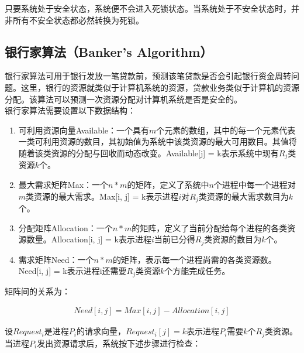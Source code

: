 只要系统处于安全状态，系统便不会进入死锁状态。当系统处于不安全状态时，并非所有不安全状态都必然转换为死锁。

\subsection{银行家算法（Banker's Algorithm）}

银行家算法可用于银行发放一笔贷款前，预测该笔贷款是否会引起银行资金周转问题。这里，银行的资源就类似于计算机系统的资源，贷款业务类似于计算机的资源分配。该算法可以预测一次资源分配对计算机系统是否是安全的。 \\

银行家算法需要设置以下数据结构：

\begin{enumerate}
	\item 可利用资源向量Available：一个具有$ m $个元素的数组，其中的每一个元素代表一类可利用资源的数目，其初始值为系统中该类资源的最大可用数目。其值将随着该类资源的分配与回收而动态改变。Available[j] = k表示系统中现有$ R_j $类资源$ k $个。

	\item 最大需求矩阵Max：一个$ n * m $的矩阵，定义了系统中$ n $个进程中每一个进程对$ m $类资源的最大需求。Max[i, j] = k表示进程$ i $对$ R_j $类资源的最大需求数目为$ k $个。

	\item 分配矩阵Allocation：一个$ n * m $的矩阵，定义了当前分配给每个进程的各类资源数量。Allocation[i, j] = k表示进程$ i $当前已分得$ R_j $类资源的数目为$ k $个。

	\item 需求矩阵Need：一个$ n * m $的矩阵，表示每一个进程尚需的各类资源数。Need[i, j] = k表示进程i还需要$ R_j $类资源$ k $个方能完成任务。
\end{enumerate}

矩阵间的关系为：

\vspace{-1cm}
\begin{align}\nonumber
	Need[i, j] = Max[i, j] - Allocation[i, j]
\end{align}

设$ Request_i $是进程$ P_i $的请求向量，$ Request_i[j] = k $表示进程$ P_i $需要$ k $个$ R_j $类资源。当进程$ P_i $发出资源请求后，系统按下述步骤进行检查：

